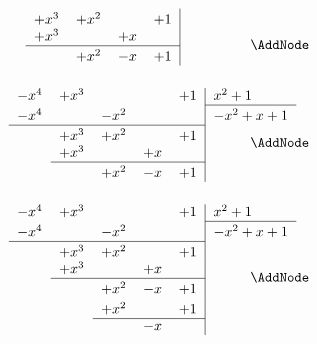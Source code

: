 \begin{NodesList}
\begin{align*}
\begin{minipage}[t]{0.5\textwidth}
\begin{tabular}{lllll|l}
  \vrule height 2.5ex width 0pt &$+x^3$ & $+x^2$ &  &$+1$&  \\ 
 &$+x^3$& &$+x$&&  \\ 
\cline{2-5}
   \vrule height 2.5ex width 0pt&  &$+x^2$&$-x$&$+1$&  \\ 
\\
\end{tabular}
\end{minipage}&\AddNode\\
\begin{minipage}[t]{0.5\textwidth}
\begin{tabular}{lllll|l}
$-x^4$& $+x^3$ & \phantom{$-x^2$} & \phantom{$-x$} &$+1$&$ x^2+1$\\ 
\cline{6-6}
  \vrule height 2.5ex width 0pt $-x^4$& &$-x^2$  &  &&$-x^2+x+1$\\ 
\cline{1-5}
  \vrule height 2.5ex width 0pt &$+x^3$ & $+x^2$ &  &$+1$&  \\ 
 &$+x^3$& &$+x$&&  \\ 
\cline{2-5}
   \vrule height 2.5ex width 0pt&  &$+x^2$&$-x$&$+1$&  \\ 
\\
\end{tabular}
\end{minipage}&\AddNode\\
\begin{minipage}[t]{0.5\textwidth}
\begin{tabular}{lllll|l}
$-x^4$& $+x^3$ & \phantom{$-x^2$} & \phantom{$-x$} &$+1$&$ x^2+1$\\ 
\cline{6-6}
  \vrule height 2.5ex width 0pt $-x^4$& &$-x^2$  &  &&$-x^2+x+1$\\ 
\cline{1-5}
  \vrule height 2.5ex width 0pt &$+x^3$ & $+x^2$ &  &$+1$&  \\ 
 &$+x^3$& &$+x$&&  \\ 
\cline{2-5}
   \vrule height 2.5ex width 0pt&  &$+x^2$&$-x$&$+1$&  \\ 
   \vrule height 2.5ex width 0pt&  &$+x^2$&&$+1$&  \\ 
\cline{3-5}
 &  &  &$-x$&&  \\ 
\\
\end{tabular}
\end{minipage}&\AddNode\\
\end{align*}
\LinkNodes{\begin{minipage}{3.5cm}


\end{minipage}}
\end{NodesList}
